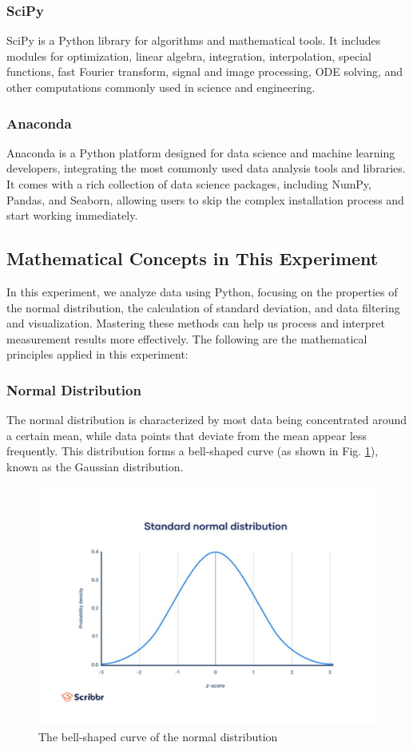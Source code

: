 \documentclass[12pt,a4paper]{article}
\begin{document}
\begin{CJK}{UTF8}{bkai}
\subsubsection{SciPy}
\hfill

SciPy is a Python library for algorithms and mathematical tools. It includes modules for optimization, linear algebra, integration, interpolation, special functions, fast Fourier transform, signal and image processing, ODE solving, and other computations commonly used in science and engineering.

\subsubsection{Anaconda}
\hfill

Anaconda is a Python platform designed for data science and machine learning developers, integrating the most commonly used data analysis tools and libraries. It comes with a rich collection of data science packages, including NumPy, Pandas, and Seaborn, allowing users to skip the complex installation process and start working immediately.


\subsection{Mathematical Concepts in This Experiment}
\hfill

In this experiment, we analyze data using Python, focusing on the properties of the normal distribution, the calculation of standard deviation, and data filtering and visualization. Mastering these methods can help us process and interpret measurement results more effectively.
The following are the mathematical principles applied in this experiment:


\subsubsection{Normal Distribution}
\hfill

The normal distribution is characterized by most data being concentrated around a certain mean, while data points that deviate from the mean appear less frequently. This distribution forms a bell-shaped curve (as shown in Fig. \ref{fig:normal}), known as the Gaussian distribution.

\begin{figure}[h]
    \centering
    \includegraphics[width=0.6\linewidth]{figures/normal_distribution.pdf}
    \caption{The bell-shaped curve of the normal distribution}
    \label{fig:normal}
\end{figure}


\end{CJK}
\end{document}
